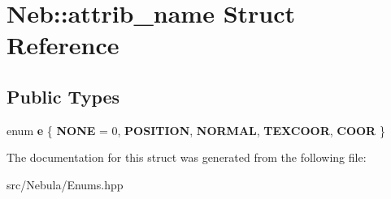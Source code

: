 \hypertarget{structNeb_1_1attrib__name}{\section{\-Neb\-:\-:attrib\-\_\-name \-Struct \-Reference}
\label{structNeb_1_1attrib__name}
}
\subsection*{\-Public \-Types}
\begin{DoxyCompactItemize}
\item 
enum {\bfseries e} \{ \*
{\bfseries \-N\-O\-N\-E} =  0, 
{\bfseries \-P\-O\-S\-I\-T\-I\-O\-N}, 
{\bfseries \-N\-O\-R\-M\-A\-L}, 
{\bfseries \-T\-E\-X\-C\-O\-O\-R}, 
\*
{\bfseries \-C\-O\-O\-R}
 \}
\end{DoxyCompactItemize}


\-The documentation for this struct was generated from the following file\-:\begin{DoxyCompactItemize}
\item 
src/\-Nebula/\-Enums.\-hpp\end{DoxyCompactItemize}
